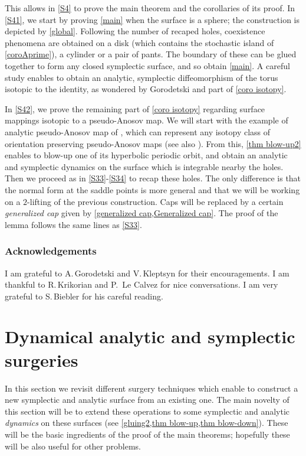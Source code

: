 This allows in \cref{S4} to prove the main theorem and the corollaries of its proof. In \cref{S41}, we start by proving \cref{main} when the surface is a sphere; the construction is depicted by \cref{global}. Following the number of recaped holes, coexistence phenomena are obtained on a disk (which contains the stochastic island of \cref{coroAprime}), a cylinder or a pair of pants. The boundary of these can be glued together to form any closed symplectic surface, and so obtain \cref{main}. A careful study enables to obtain an analytic, symplectic diffeomorphism of the torus isotopic to the identity, as wondered by Gorodetski and part of \cref{coro isotopy}.

In \cref{S42}, we prove the remaining part of \cref{coro isotopy} regarding surface mappings isotopic to a pseudo-Anosov map. We will start with the example of analytic pseudo-Anosov map of \cite{Ge85}, which can represent any isotopy class of orientation preserving pseudo-Anosov maps (see also \cite{GK82}). From this, \cref{thm blow-up2} enables to blow-up one of its hyperbolic periodic orbit, and obtain an analytic and symplectic dynamics on the surface which is integrable nearby the holes. Then we proceed as in \cref{S33}-\ref{S34} to recap these holes. The only difference is that the normal form \cite{Mo56} at the saddle points is more general and that we will be working on a $2$-lifting of the previous construction. Caps will be replaced by a certain \emph{generalized cap} given by \cref{generalized cap,Generalized cap}. The proof of the lemma follows the same lines as \cref{S33}.\enlargethispage{.5\baselineskip}%

\subsubsection*{Acknowledgements}
I am grateful to A.\,Gorodetski and V.\,Kleptsyn for their encouragements. I am thankful to R.\,Krikorian and P.~Le Calvez for nice conversations. I am very grateful to S.\,Biebler for his careful reading.

\section{Dynamical analytic and symplectic surgeries}\label{S2}

In this section we revisit different surgery techniques which enable to construct a new symplectic and analytic surface from an existing one. The main novelty of this section will be to extend these operations to some symplectic and analytic \emph{dynamics} on these surfaces (see \cref{gluing2,thm blow-up,thm blow-down}). These will be the basic ingredients of the proof of the main theorems; hopefully these will be also useful for other problems.

